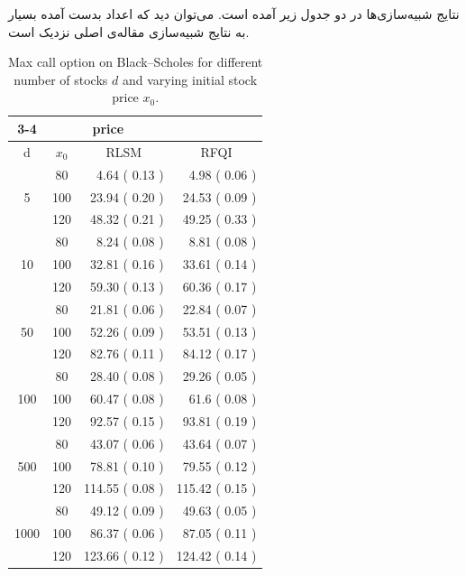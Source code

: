 \documentclass[hidelinks, 11pt]{article}
\begin{document}
نتایج شبیه‌سازی‌ها در دو جدول زیر آمده است.  می‌توان دید که اعداد بدست آمده
بسیار به نتایج شبیه‌سازی مقاله‌ی اصلی نزدیک است.

\begin{latin}
\begin{table}[htbp]
\centering
\begin{tabular}{|cc|r|r|}
\cline{3-4}
\multicolumn{2}{}{}         &            \multicolumn{2}{|c|}{price}                  \\ \hline
d                   & $x_0$ & \multicolumn{1}{|c|}{RLSM} & \multicolumn{1}{|c|}{RFQI} \\ \hline
                    & 80    & 4.64   ( 0.13 )            & 4.98   ( 0.06 )            \\
5                   & 100   & 23.94  ( 0.20 )            & 24.53  ( 0.09 )            \\
                    & 120   & 48.32  ( 0.21 )            & 49.25  ( 0.33 )            \\ \hline
                    & 80    & 8.24   ( 0.08 )            & 8.81   ( 0.08 )            \\
10                  & 100   & 32.81  ( 0.16 )            & 33.61  ( 0.14 )            \\
                    & 120   & 59.30  ( 0.13 )            & 60.36  ( 0.17 )            \\ \hline
                    & 80    & 21.81  ( 0.06 )            & 22.84  ( 0.07 )            \\
50                  & 100   & 52.26  ( 0.09 )            & 53.51  ( 0.13 )            \\
                    & 120   & 82.76  ( 0.11 )            & 84.12  ( 0.17 )            \\ \hline
                    & 80    & 28.40  ( 0.08 )            & 29.26  ( 0.05 )            \\
100                 & 100   & 60.47  ( 0.08 )            & 61.6   ( 0.08 )            \\
                    & 120   & 92.57  ( 0.15 )            & 93.81  ( 0.19 )            \\ \hline
                    & 80    & 43.07  ( 0.06 )            & 43.64  ( 0.07 )            \\
500                 & 100   & 78.81  ( 0.10 )            & 79.55  ( 0.12 )            \\
                    & 120   & 114.55 ( 0.08 )            & 115.42 ( 0.15 )            \\ \hline
                    & 80    & 49.12  ( 0.09 )            & 49.63  ( 0.05 )            \\
1000                & 100   & 86.37  ( 0.06 )            & 87.05  ( 0.11 )            \\
                    & 120   & 123.66 ( 0.12 )            & 124.42 ( 0.14 )            \\ \hline
\end{tabular}
\caption{Max call option on Black–Scholes for different number of stocks $d$ and varying initial stock price $x_0$.}
\end{table}
\end{latin}
\end{document}
